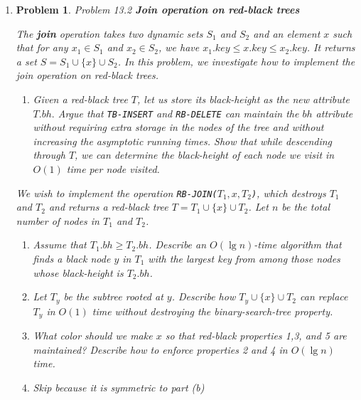 \documentclass[a4paper]{article}
\newtheorem*{problem}{Problem}
\begin{document}
\begin{enumerate}
  \item

    \begin{problem}

      Problem 13.2 \textbf{Join operation on red-black trees}

      The \textbf{join} operation takes two dynamic sets $S_1$ and $S_2$ and an element $x$ such that for any $x_1 \in S_1$ and $x_2 \in S_2$, we have
      $x_1.key \leq x.key \leq x_2.key$. It returns a set $S = S_1 \cup \{x\} \cup S_2$. In this problem, we investigate how to implement the join
      operation on red-black trees.

      \begin{enumerate}
        \item Given a red-black tree $T$, let us store its black-height as the new attribute $T.bh.$ Argue that \texttt{TB-INSERT} and
          \texttt{RB-DELETE} can maintain the $bh$ attribute without requiring extra storage in the nodes of the tree and without increasing the
          asymptotic running times. Show that while descending through $T$, we can determine the black-height of each node we visit in $O(1)$ time per
          node visited.
      \end{enumerate}

      We wish to implement the operation \texttt{RB-JOIN($T_1,x,T_2$)}, which destroys $T_1$ and $T_2$ and returns a red-black tree $T = T_1 \cup
      \{x\} \cup T_2$. Let $n$ be the total number of nodes in $T_1$ and $T_2$.

      \begin{enumerate}[resume]

        \item
          Assume that $T_1.bh \geq T_2.bh$. Describe an $O(\lg n)$-time algorithm that finds a black node $y$ in $T_1$ with the largest key from among
          those nodes whose black-height is $T_2.bh$.

        \item Let $T_y$ be the subtree rooted at $y$. Describe how $T_y \cup \{x\} \cup T_2$ can replace $T_y$ in $O(1)$ time without destroying the
          binary-search-tree property.

        \item
          What color should we make $x$ so that red-black properties 1,3, and 5 are maintained? Describe how to enforce properties 2 and 4 in $O( \lg
          n)$ time.

        \item
          Skip because it is symmetric to part (b)


\end{enumerate}
\end{problem}
\end{enumerate}
\end{document}

